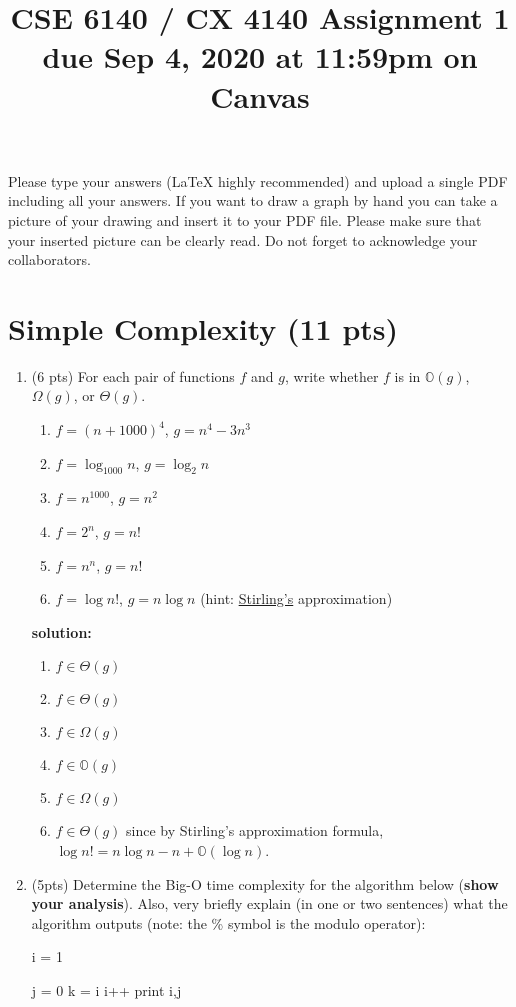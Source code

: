 \documentclass{article}
\title{CSE 6140 / CX 4140 Assignment 1\\due Sep 4, 2020 at 11:59pm on Canvas }
\author{}
\date{}
\begin{document}
\maketitle

Please type your answers (\LaTeX{} highly recommended) and upload a single PDF including all your answers. If you want to draw a graph by hand you can take a picture of your drawing and insert it to your PDF file. Please make sure that your inserted picture can be clearly read. Do not forget to acknowledge your collaborators.


	\section{Simple Complexity (11 pts)}
	\begin{enumerate}
		\item (6 pts) For each pair of functions $f$ and $g$, write whether $f$ is in $\mathbb{O}(g)$, $\Omega(g)$, or $\Theta(g)$.
		\begin{enumerate}
			\item $f = (n+1000)^4$, $g = n^4 - 3n^3$
			\item $f = \log_{1000} n$, $g = \log_2 n$
			\item $f = n^{1000}$, $g = n^2$
			\item $f = 2^n$, $g = n!$
			\item $f = n^n$, $g = n!$
			\item $f = \log n!$, $g = n \log n $	\hfill (hint: \href{https://en.wikipedia.org/wiki/Stirling\%27s_approximation} {Stirling's} approximation)		
		\end{enumerate}
		
		\begin{tcolorbox}
		\textbf{solution:}
		\begin{enumerate}
            		\item $f \in \Theta(g)$
            		\item $f \in \Theta(g)$
    		        \item  $f \in \Omega(g)$
		        \item $f \in \mathbb{O}(g)$
		        \item $f \in \Omega(g)$
		        \item $f \in \Theta(g)$ since by Stirling's approximation formula, $\log n! = n \log n - n + \mathbb{O}(\log n)$. 		
		\end{enumerate}
		\end{tcolorbox}
		
		\item (5pts) Determine the Big-O time complexity for the algorithm below (\textbf{show your analysis}). Also, very briefly explain (in one or two sentences) what the algorithm outputs (note: the \% symbol is the modulo operator):\\
		\begin{algorithm}[H]
			\SetAlgoLined
			i = 1\;
			 {
				j = 0\;
				k = i\;
				i++ \;
				print i,j\;
				
			}
		\end{algorithm}
	\end{enumerate}
	
\end{document}

